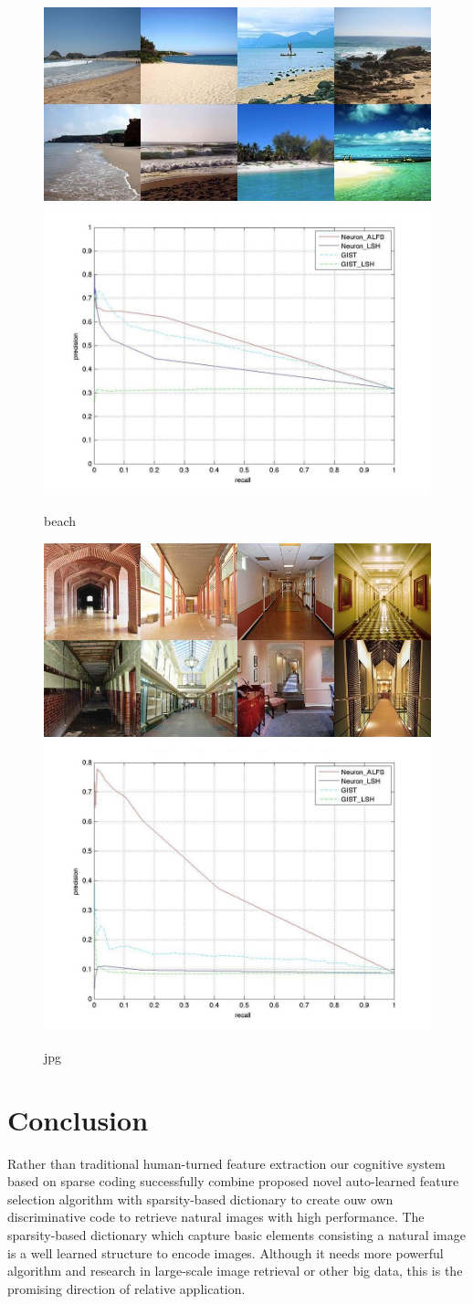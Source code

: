 \documentclass[letterpaper]{article}
\begin{document}
\begin{figure}[!ht]
		\centering
		\includegraphics[width=.4\textwidth]{figures_dir/beach.jpg}
		\includegraphics[width=.4\textwidth]{figures_dir/beach_10queries.jpg}
		\caption{beach}
		\label{beach}
\end{figure}

\begin{figure}[!ht]
		\centering
		\includegraphics[width=.4\textwidth]{figures_dir/corridor.jpg}
		\includegraphics[width=.4\textwidth]{figures_dir/corridor_10queries.jpg}
		\caption{jpg}
		\label{TEMP!!!corridor}
\end{figure}
\section{Conclusion}
Rather than traditional human-turned feature extraction our cognitive system based on sparse coding successfully combine proposed novel auto-learned feature selection algorithm with sparsity-based dictionary to create ouw own discriminative code to retrieve natural images with high performance. The sparsity-based dictionary which capture basic elements consisting a natural image is a well learned structure to encode images. Although it needs more powerful algorithm and research in large-scale image retrieval or other big data, this is the promising direction of relative application.  
\end{document}
